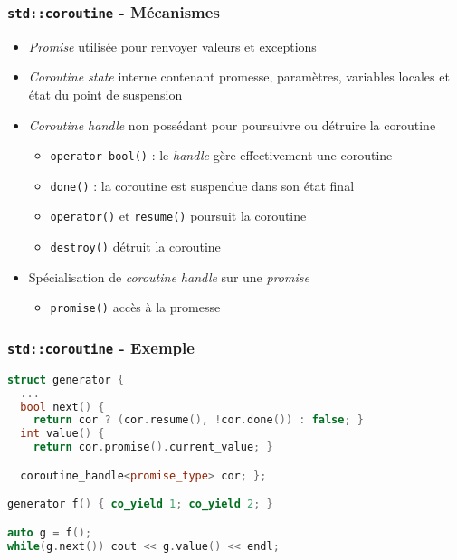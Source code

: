 \documentclass[C++.tex]{subfiles}
\begin{document}
\begin{frame}[fragile]
	\frametitle{\lstinline|std::coroutine| - Mécanismes}
	\begin{itemize}
		\item \textit{Promise} utilisée pour renvoyer valeurs et exceptions
		\item \textit{Coroutine state} interne contenant promesse, paramètres, variables locales et état du point de suspension
		\item \textit{Coroutine handle} non possédant pour poursuivre ou détruire la coroutine
		\begin{itemize}
			\item \lstinline|operator bool()| : le \textit{handle} gère effectivement une coroutine
			\item \lstinline|done()| : la coroutine est suspendue dans son état final


			\item \lstinline|operator()| et \lstinline|resume()| poursuit la coroutine
			\item \lstinline|destroy()| détruit la coroutine
		\end{itemize}
		\item Spécialisation de \textit{coroutine handle} sur une \textit{promise}
		\begin{itemize}
			\item \lstinline|promise()| accès à la promesse
		\end{itemize}
	\end{itemize}
\end{frame}

\begin{frame}[fragile]
	\frametitle{\lstinline|std::coroutine| - Exemple}
	\begin{lstlisting}[language=C++]
struct generator {
  ...
  bool next() { 
    return cor ? (cor.resume(), !cor.done()) : false; }
  int value() { 
    return cor.promise().current_value; }

  coroutine_handle<promise_type> cor; };

generator f() { co_yield 1; co_yield 2; }

auto g = f();
while(g.next()) cout << g.value() << endl;\end{lstlisting}
\end{frame}
\end{document}
